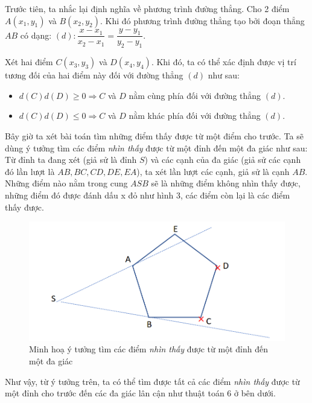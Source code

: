 \documentclass[a4paper, 11pt]{article}
\begin{document}
Trước tiên, ta nhắc lại định nghĩa về phương trình đường thẳng. Cho 2 điểm $A(x_1, y_1)$ và $B(x_2, y_2) $. Khi đó phương trình đường thẳng tạo bởi đoạn thẳng $AB$ có dạng: $(d): \dfrac{x - x_1}{x_2 - x_1} = \dfrac{y - y_1}{y_2 - y_1}$.

Xét hai điểm $C(x_3, y_3)$ và $D(x_4, y_4)$. Khi đó, ta có thể xác định được vị trí tương đối của hai điểm này đối với đường thẳng $(d)$ như sau:

\begin{itemize}
  \item $d(C)d(D) \geq 0 \Rightarrow C$ và $D$ nằm cùng phía đối với đường thẳng $(d)$.
  \item $d(C)d(D) \leq 0 \Rightarrow C$ và $D$ nằm khác phía đối với đường thẳng $(d)$.
\end{itemize}

Bây giờ ta xét bài toán tìm những điểm thấy được từ một điểm cho trước. Ta sẽ dùng ý tưởng tìm các điểm \textit{nhìn thấy} được từ một đỉnh đến một đa giác như sau: Từ đỉnh ta đang xét (giả sử là đỉnh $S$) và các cạnh của đa giác (giả sử các cạnh đó lần lượt là $AB, BC, CD, DE, EA$), ta xét lần lượt các cạnh, giả sử là cạnh $AB$. Những điểm nào nằm trong cung $ASB$ sẽ là những điểm không nhìn thấy được, những điểm đó được đánh dấu x đỏ như hình 3, các điểm còn lại là các điểm thấy được.


\begin{figure}[h]
  \centering
  \includegraphics[width=.75\textwidth,height=.75\textheight,keepaspectratio]{can_see.png}
  \caption{Minh hoạ ý tưởng tìm các điểm \textit{nhìn thấy} được từ một đỉnh đến một đa giác}
\end{figure}

Như vậy, từ ý tưởng trên, ta có thể tìm được tất cả các điểm \textit{nhìn thấy} được từ một đỉnh cho trước đến các đa giác lân cận như thuật toán 6 ở bên dưới.
\end{document}
